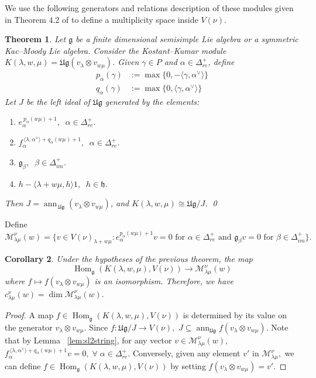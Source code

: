 \documentclass[12pt,reqno]{amsart}
\theoremstyle{plain}
\newtheorem{theorem}{Theorem}[section]
\newtheorem{corollary}[theorem]{Corollary}
\theoremstyle{definition}
\theoremstyle{plain}
\newcommand{\posreal}[1][+]{\Delta_{re}^{#1}}
\newcommand{\posimag}{\Delta_{im}^+}
\newcommand{\lie}{\mathfrak}
\newcommand{\lrw}{c_{\lambda\mu}^\nu(w)}
\DeclareMathOperator{\ann}{ann}
\DeclareMathOperator{\Hom}{Hom}
\begin{document}
We use the following generators and relations description of these modules given in Theorem 4.2 of \cite{MRV} to define a multiplicity space inside $V(\nu)$.
\begin{theorem}\label{thm:gen-rel}
    Let $\mathfrak{g}$ be a finite dimensional semisimple Lie algebra or a symmetric Kac--Moody Lie algebra. Consider the Kostant--Kumar module $K(\lambda,w,\mu)=\mathfrak{Ug} (v_\lambda\otimes v_{w\mu})$. Given $\gamma \in P$ and $\alpha \in \posreal$, define 
\begin{align*}
    p_\alpha(\gamma) &:= \max \{0, -\langle \gamma, \alpha^\vee\rangle\}\\
    q_\alpha(\gamma) &:= \max \{0, \langle \gamma, \alpha^\vee\rangle\} 
\end{align*} 
Let $J$ be the left ideal of $\mathfrak{Ug}$ generated by the elements:  
    \begin{enumerate}
        \item $e_\alpha^{\,p_\alpha (w\mu)+1}, \;\; \alpha \in \posreal$.
        \smallskip\item $f_\alpha^{\,\langle \lambda, \alpha^\vee \rangle + q_\alpha (w\mu)+1}, \;\; \alpha \in \posreal$.
        \smallskip\item ${\lie g}_\beta, \;\; \beta \in \posimag$.
        \smallskip\item $ h - \langle \lambda + w\mu, h \rangle 1, \;\; h \in \mathfrak{h}$.
    \end{enumerate}
    Then $J=\ann_{\,\mathfrak{Ug}} (v_\lambda \otimes v_{w\mu})$, and $K(\lambda, w, \mu) \cong \mathfrak{Ug}/J$. \qed
\end{theorem}
Define $$\mathcal{M}_{\lambda\mu}^\nu(w)= \{v \in V(\nu)_{\lambda+w\mu}: e_\alpha^{p_\alpha(w\mu)+1} v =0 \text{ for } \alpha \in \posreal \text{ and } {\lie g}_{\beta} v =0 \text{ for } \beta \in \posimag\}.$$

\begin{corollary}
    Under the hypotheses of the previous theorem, the map \begin{equation} \Hom_{\lie g} (K(\lambda,w,\mu), V(\nu))\to \mathcal{M}_{\lambda\mu}^{\nu}(w) \end{equation}\label{map}
    where $f\mapsto f(v_\lambda\otimes v_{w\mu})$ is an isomorphism. Therefore, we have 
    $\lrw = \dim \mathcal{M}_{\lambda\mu}^\nu(w).$
\end{corollary}
\begin{proof}
    A map $f\in \Hom_{\lie g} (K(\lambda,w,\mu), V(\nu))$ is determined by its value on the generator $v_\lambda\otimes v_{w\mu}.$ Since $f: \lie{Ug}/J\to V(\nu),$ $J\subseteq \ann_{\lie{Ug}}f(v_\lambda\otimes v_{w\mu}).$ Note that by Lemma ~\ref{lem:sl2string}, for any vector $v\in \mathcal{M}_{\lambda\mu}^{\nu}(w),$ $f_\alpha^{\,\langle \lambda, \alpha^\vee \rangle + q_\alpha (w\mu)+1}v=0, \;\forall\; \alpha \in \posreal$. Conversely, given any element $v'$ in $\mathcal{M}_{\lambda\mu}^{\nu},$ we can define $f\in \Hom_{\lie g} (K(\lambda,w,\mu), V(\nu))$ by setting $f(v_\lambda\otimes v_{w\mu})=v'.$
\end{proof}
\end{document}
